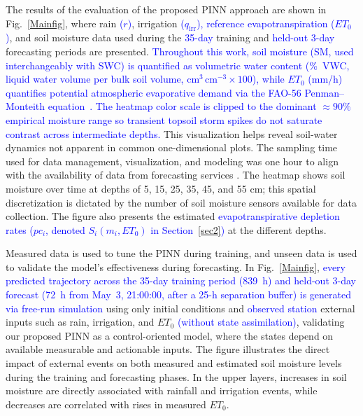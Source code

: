 \documentclass[pdflatex,sn-nature]{sn-jnl}%
\theoremstyle{thmstyleone}%
\theoremstyle{thmstyletwo}%
\theoremstyle{thmstylethree}%
\begin{document}
The results of the evaluation of the proposed PINN approach are shown in Fig.~\ref{Mainfig}, where rain \textcolor{blue}{($r$)}, irrigation \textcolor{blue}{($q_{\mathrm{irr}}$), reference evapotranspiration ($ET_0$)}, and soil moisture data used during the \textcolor{blue}{35-day} training and \textcolor{blue}{held-out 3-day} forecasting periods are presented. \textcolor{blue}{Throughout this work, soil moisture (SM, used interchangeably with SWC) is quantified as volumetric water content (\si{\%VWC}, liquid water volume per bulk soil volume, $\mathrm{cm^3\,cm^{-3}} \times 100$), while $ET_0$ (\si{mm/h}) quantifies potential atmospheric evaporative demand via the FAO-56 Penman--Monteith equation~\cite{allen1998crop}. The heatmap color scale is clipped to the dominant $\approx 90\%$ empirical moisture range so transient topsoil storm spikes do not saturate contrast across intermediate depths.} This visualization helps reveal soil-water dynamics not apparent in common one-dimensional plots. The sampling time used for data management, visualization, and modeling was one hour to align with the availability of data from forecasting services \cite{NWS2024}. The heatmap shows soil moisture over time at depths of 5, 15, 25, 35, 45, and 55 \si{cm}; this spatial discretization is dictated by the number of soil moisture sensors available for data collection. The figure also presents the estimated \textcolor{blue}{evapotranspirative depletion rates ($pc_i$, denoted $S_i(m_i,ET_0)$ in Section~\ref{sec2})} at the different depths.

Measured data is used to tune the PINN during training, and unseen data is used to validate the model's effectiveness during forecasting. In Fig.~\ref{Mainfig}, \textcolor{blue}{every predicted trajectory across the 35-day training period (839~h) and held-out 3-day forecast (72~h from May~3, 21:00:00, after a 25-h separation buffer) is generated via free-run simulation} using only initial conditions and \textcolor{blue}{observed station} external inputs such as rain, irrigation, and $ET_0$ \textcolor{blue}{(without state assimilation)}, validating our proposed PINN as a control-oriented model, where the states depend on available measurable and actionable inputs. The figure illustrates the direct impact of external events on both measured and estimated soil moisture levels during the training and forecasting phases. In the upper layers, increases in soil moisture are directly associated with rainfall and irrigation events, while decreases are correlated with rises in measured $ET_0$.
\end{document}
